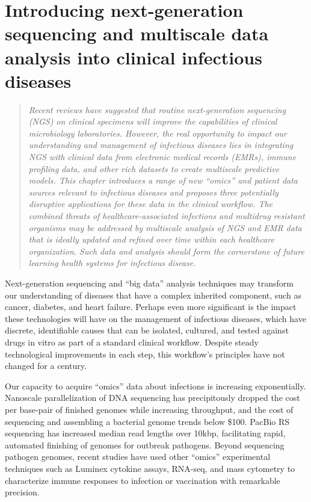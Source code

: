 
\chapter{Introducing next-generation sequencing and multiscale data analysis into clinical infectious diseases}

\begin{quote}
\emph{Recent reviews have suggested that routine next-generation sequencing (NGS) on clinical specimens will improve the capabilities of clinical microbiology laboratories. However, the real opportunity to impact our understanding and management of infectious diseases lies in integrating NGS with clinical data from electronic medical records (EMRs), immune profiling data, and other rich datasets to create multiscale predictive models. This chapter introduces a range of new “omics” and patient data sources relevant to infectious diseases and proposes three potentially disruptive applications for these data in the clinical workflow. The combined threats of healthcare-associated infections and multidrug resistant organisms may be addressed by multiscale analysis of NGS and EMR data that is ideally updated and refined over time within each healthcare organization. Such data and analysis should form the cornerstone of future learning health systems for infectious disease.}
\end{quote}

Next-generation sequencing and “big data” analysis techniques may transform our understanding of diseases that have a complex inherited component, such as cancer, diabetes, and heart failure. Perhaps even more significant is the impact these technologies will have on the management of infectious diseases, which have discrete, identifiable causes that can be isolated, cultured, and tested against drugs in vitro as part of a standard clinical workflow. Despite steady technological improvements in each step, this workflow’s principles have not changed for a century.\autocite{Didelot2012,Koser2012}

Our capacity to acquire “omics” data about infections is increasing exponentially. Nanoscale parallelization of DNA sequencing has precipitously dropped the cost per base-pair of finished genomes while increasing throughput, and the cost of sequencing and assembling a bacterial genome trends below \$100.\autocite{Didelot2012} PacBio RS sequencing has increased median read lengths over 10kbp, facilitating rapid, automated finishing of genomes for outbreak pathogens.\autocite{Chin2011,Rasko2011} Beyond sequencing pathogen genomes, recent studies have used other “omics” experimental techniques such as Luminex cytokine assays, RNA-seq, and mass cytometry to characterize immune responses to infection or vaccination with remarkable precision.\autocite{Mejias2014,Querec2009}

